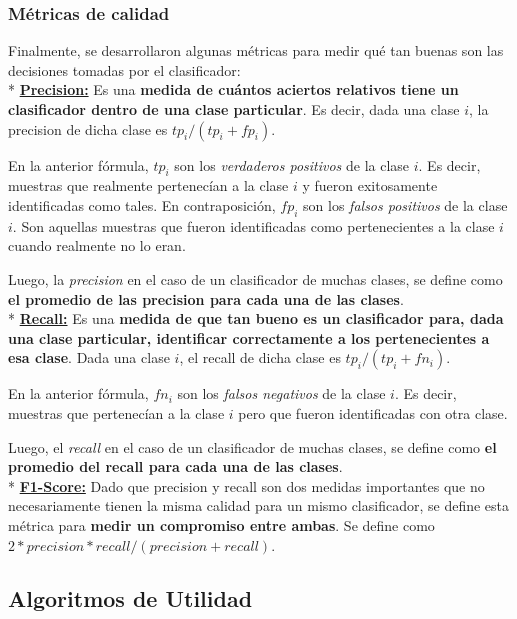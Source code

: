 \subsubsection{M\'etricas de calidad}

Finalmente, se desarrollaron algunas m\'etricas para medir qu\'e tan buenas son las decisiones tomadas por el clasificador: \\

* \underline{\textbf{Precision:}} Es una \textbf{medida de cu\'antos aciertos relativos tiene un clasificador dentro de una clase particular}. Es decir, dada una clase $i$, la precision de dicha clase es $tp_{i} / (tp_{i} + fp_{i})$.

En la anterior f\'ormula, $tp_{i}$ son los \textit{verdaderos positivos} de la clase $i$. Es decir, muestras que realmente pertenec\'ian a la clase $i$ y fueron exitosamente identificadas como tales. En contraposici\'on, $fp_{i}$ son los \textit{falsos positivos} de la clase $i$. Son aquellas muestras que fueron identificadas como pertenecientes a la clase $i$ cuando realmente no lo eran.

Luego, la \textit{precision} en el caso de un clasificador de muchas clases, se define como \textbf{el promedio de las precision para cada una de las clases}. \\

* \underline{\textbf{Recall:}} Es una \textbf{medida de que tan bueno es un clasificador para, dada una clase particular, identificar correctamente a los pertenecientes a esa clase}. Dada una clase $i$, el recall de dicha clase es $tp_{i} / (tp_{i} + fn_{i})$.

En la anterior f\'ormula, $fn_{i}$ son los \textit{falsos negativos} de la clase $i$. Es decir, muestras que pertenec\'ian a la clase $i$ pero que fueron identificadas con otra clase.

Luego, el \textit{recall} en el caso de un clasificador de muchas clases, se define como \textbf{el promedio del recall para cada una de las clases}. \\

* \underline{\textbf{F1-Score:}} Dado que precision y recall son dos medidas importantes que no necesariamente tienen la misma calidad para un mismo clasificador, se define esta m\'etrica para \textbf{medir un compromiso entre ambas}. Se define como $2 * precision * recall / (precision + recall)$.

\subsection{Algoritmos de Utilidad}

